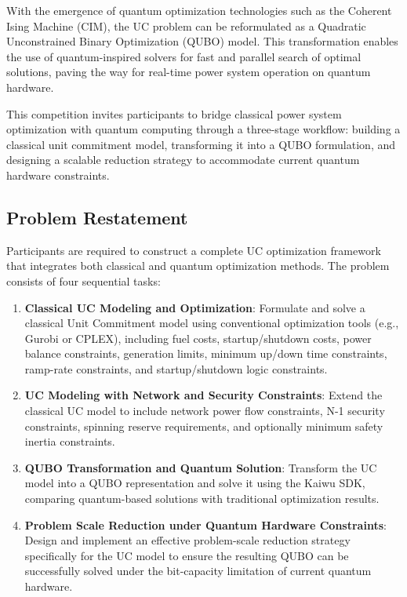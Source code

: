 \documentclass{apmcmthesis}
\begin{document}
With the emergence of quantum optimization technologies such as the Coherent Ising Machine (CIM), the UC problem can be reformulated as a Quadratic Unconstrained Binary Optimization (QUBO) model. This transformation enables the use of quantum-inspired solvers for fast and parallel search of optimal solutions, paving the way for real-time power system operation on quantum hardware.

This competition invites participants to bridge classical power system optimization with quantum computing through a three-stage workflow: building a classical unit commitment model, transforming it into a QUBO formulation, and designing a scalable reduction strategy to accommodate current quantum hardware constraints.

\subsection{Problem Restatement}
Participants are required to construct a complete UC optimization framework that integrates both classical and quantum optimization methods. The problem consists of four sequential tasks:

\begin{enumerate}
\item \textbf{Classical UC Modeling and Optimization}: Formulate and solve a classical Unit Commitment model using conventional optimization tools (e.g., Gurobi or CPLEX), including fuel costs, startup/shutdown costs, power balance constraints, generation limits, minimum up/down time constraints, ramp-rate constraints, and startup/shutdown logic constraints.

\item \textbf{UC Modeling with Network and Security Constraints}: Extend the classical UC model to include network power flow constraints, N-1 security constraints, spinning reserve requirements, and optionally minimum safety inertia constraints.

\item \textbf{QUBO Transformation and Quantum Solution}: Transform the UC model into a QUBO representation and solve it using the Kaiwu SDK, comparing quantum-based solutions with traditional optimization results.

\item \textbf{Problem Scale Reduction under Quantum Hardware Constraints}: Design and implement an effective problem-scale reduction strategy specifically for the UC model to ensure the resulting QUBO can be successfully solved under the bit-capacity limitation of current quantum hardware.
\end{enumerate}
\end{document}
